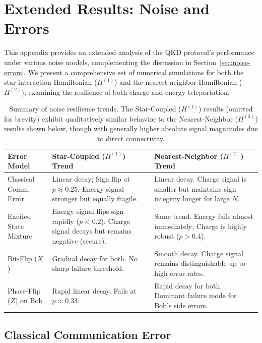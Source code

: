 \section{Extended Results: Noise and Errors}
\label{appendix:noise-errors}

This appendix provides an extended analysis of the QKD protocol's performance under various noise models, complementing the discussion in Section~\ref{sec:noise-errors}. We present a comprehensive set of numerical simulations for both the star-interaction Hamiltonian ($H^{(1)}$) and the nearest-neighbor Hamiltonian ($H^{(2)}$), examining the resilience of both charge and energy teleportation.

\begin{table}[h]
\centering
\begin{tabular}{|l|p{6cm}|p{6cm}|}
\hline
\textbf{Error Model} & \textbf{Star-Coupled ($H^{(1)}$) Trend} & \textbf{Nearest-Neighbor ($H^{(2)}$) Trend} \\ \hline
Classical Comm. Error & Linear decay; Sign flip at $p \approx 0.25$. Energy signal stronger but equally fragile. & Linear decay. Charge signal is smaller but maintains sign integrity longer for large $N$. \\ \hline
Excited State Mixture & Energy signal flips sign rapidly ($p < 0.2$). Charge signal decays but remains negative (secure). & Same trend. Energy fails almost immediately; Charge is highly robust ($p > 0.4$). \\ \hline
Bit-Flip ($X$) & Gradual decay for both. No sharp failure threshold. & Smooth decay. Charge signal remains distinguishable up to high error rates. \\ \hline
Phase-Flip ($Z$) on Bob & Rapid linear decay. Fails at $p \approx 0.33$. & Rapid decay for both. Dominant failure mode for Bob's side errors. \\ \hline
\end{tabular}
\caption{Summary of noise resilience trends. The Star-Coupled ($H^{(1)}$) results (omitted for brevity) exhibit qualitatively similar behavior to the Nearest-Neighbor ($H^{(2)}$) results shown below, though with generally higher absolute signal magnitudes due to direct connectivity.}
\label{tab:noise_summary}
\end{table}

\subsection{Classical Communication Error}

